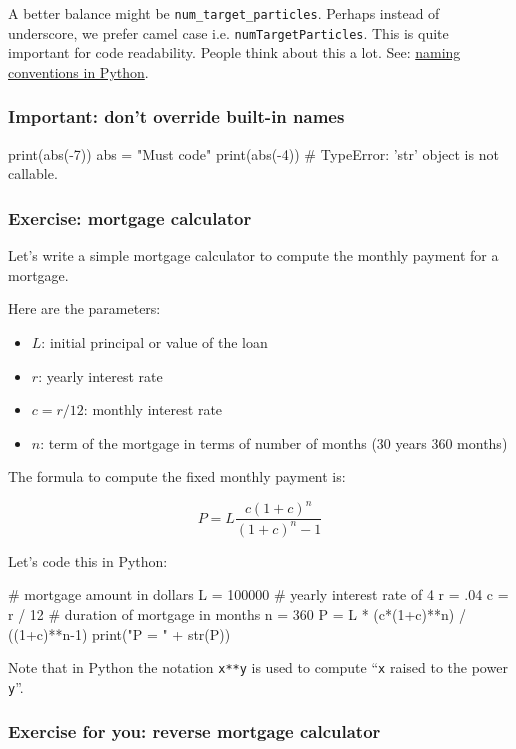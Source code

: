 \documentclass[12pt,letterpaper,twoside]{article}
\begin{document}
A better balance might be
\texttt{num\_target\_particles}. Perhaps instead of underscore, we
prefer camel case i.e. \texttt{numTargetParticles}.
This is quite important for code readability. People think about this a
lot. See:
\href{https://www.python.org/dev/peps/pep-0008/\#naming-conventions}
{naming conventions in Python}.

\subsubsection{Important: don't override built-in names}

\begin{python}
print(abs(-7))
abs = "Must code"
print(abs(-4))      # TypeError: 'str' object is not callable.
\end{python}

\subsubsection{Exercise: mortgage calculator}

Let's write a simple mortgage calculator to compute the monthly payment
for a mortgage.

Here are the parameters:

\begin{itemize}
\item $L$: initial principal or value of the loan
\item $r$: yearly interest rate
\item $c = r/12$: monthly interest rate
\item $n$: term of the mortgage in terms of number of months (30 years
  360 months)
\end{itemize}

The formula to compute the fixed monthly payment is:

\[
P = L \frac{c(1+c)^n}{(1+c)^n-1}
\]

Let's code this in Python:

\begin{python}
# mortgage amount in dollars
L = 100000
# yearly interest rate of 4%
r = .04
c = r / 12
# duration of mortgage in months
n = 360
P = L * (c*(1+c)**n) / ((1+c)**n-1)
print("P = " + str(P))
\end{python}

Note that in Python the notation \texttt{x**y} is used to compute
``\texttt{x} raised to the power \texttt{y}''.

\subsubsection{Exercise for you: reverse mortgage calculator}
\end{document}
